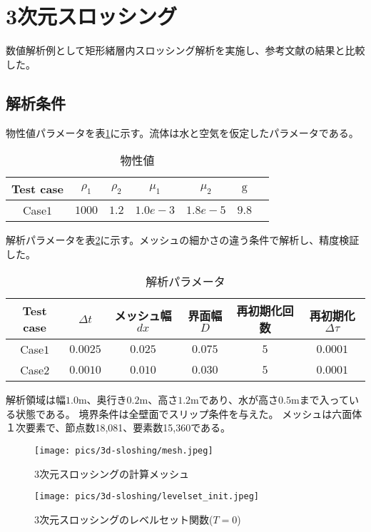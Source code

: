 \newpage
\section{3次元スロッシング}

数値解析例として矩形緒層内スロッシング解析を実施し、参考文献の結果と比較した。

\subsection{解析条件}

物性値パラメータを表\ref{table:3d-sloshing-material-property}に示す。流体は水と空気を仮定したパラメータである。
\renewcommand{\arraystretch}{1}
\begin{table}[H]
	\centering
	\caption{物性値}
	\begin{tabular}{ccccccc}
		\hline
		Test case & $\rho_1$ & $\rho_2$ & $\mu_1$ & $\mu_2$ & $\mathrm{g}$ \\
		\hline 
		Case$1$ & $1000$ & $1.2$ & $1.0e-3$ & $1.8e-5$ & $9.8$ \\
		\hline         
	\end{tabular}
	\label{table:3d-sloshing-material-property}
\end{table}
\renewcommand{\arraystretch}{1.0}

解析パラメータを表\ref{table:3d-sloshing-parameter}に示す。メッシュの細かさの違う条件で解析し、精度検証した。
\renewcommand{\arraystretch}{1}
\begin{table}[H]
	\centering
	\caption{解析パラメータ}
	\begin{tabular}{cccccc}
		\hline
		Test case & $\Delta t$ & メッシュ幅$dx$ & 界面幅$D$ & 再初期化回数 & 再初期化$\Delta \tau$\\
		\hline 
		Case$1$ & $0.0025$ & $0.025$ & $0.075$ & $5$ & $0.0001$\\
		Case$2$ & $0.0010$ & $0.010$ & $0.030$ & $5$ & $0.0001$\\
		\hline         
	\end{tabular}
	\label{table:3d-sloshing-parameter}
\end{table}
\renewcommand{\arraystretch}{1.0}

解析領域は幅$1.0\mathrm{m}$、奥行き$0.2\mathrm{m}$、高さ$1.2\mathrm{m}$であり、水が高さ$0.5\mathrm{m}$まで入っている状態である。
境界条件は全壁面でスリップ条件を与えた。
メッシュは六面体１次要素で、節点数18,081、要素数15,360である。

\begin{figure}[H]
	\centering
	\begin{minipage}[b]{0.49\columnwidth}
	    \centering
	    \texttt{[image: pics/3d-sloshing/mesh.jpeg]}
		\caption{3次元スロッシングの計算メッシュ}
		\label{fig:3d-sloshing-mesh}
	\end{minipage}
	\begin{minipage}[b]{0.49\columnwidth}
	    \centering
	    \texttt{[image: pics/3d-sloshing/levelset\_init.jpeg]}
		\caption{3次元スロッシングのレベルセット関数($T=0$)}
		\label{fig:3d-sloshing-levelset_t0_3d}
	\end{minipage}
\end{figure}

